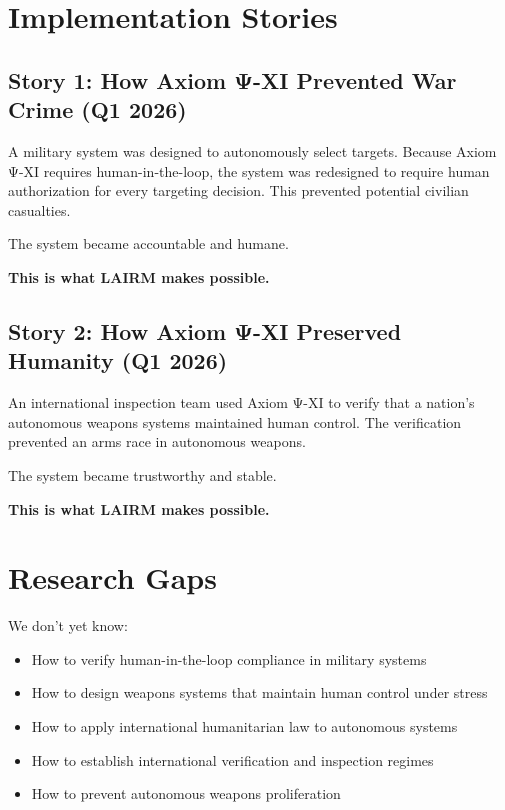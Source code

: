 \section{Implementation Stories}

\subsection{Story 1: How Axiom Ψ-XI Prevented War Crime (Q1 2026)}

A military system was designed to autonomously select targets. Because Axiom Ψ-XI requires human-in-the-loop, the system was redesigned to require human authorization for every targeting decision. This prevented potential civilian casualties.

The system became accountable and humane.

\textbf{This is what LAIRM makes possible.}

\subsection{Story 2: How Axiom Ψ-XI Preserved Humanity (Q1 2026)}

An international inspection team used Axiom Ψ-XI to verify that a nation's autonomous weapons systems maintained human control. The verification prevented an arms race in autonomous weapons.

The system became trustworthy and stable.

\textbf{This is what LAIRM makes possible.}

\vspace{0.5cm}

\section{Research Gaps}

We don't yet know:

\begin{itemize}
    \item How to verify human-in-the-loop compliance in military systems
    
    \item How to design weapons systems that maintain human control under stress
    
    \item How to apply international humanitarian law to autonomous systems
    
    \item How to establish international verification and inspection regimes
    
    \item How to prevent autonomous weapons proliferation
\end{itemize}

